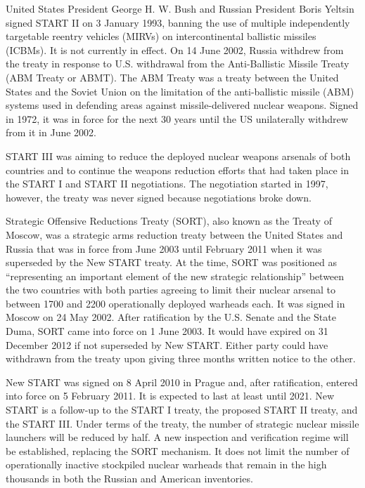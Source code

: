 \documentclass[twoside,titlepage,11pt,twocolumn,a4paper]{article}
\begin{document}
United States President George H. W. Bush and Russian President Boris
Yeltsin signed START II on 3 January 1993, banning the use of multiple
independently targetable reentry vehicles (MIRVs) on intercontinental
ballistic missiles (ICBMs). \citep{startII} It is not currently in
effect. On 14 June 2002, Russia withdrew from the treaty in response
to U.S. withdrawal from the Anti-Ballistic Missile Treaty (ABM Treaty 
or ABMT). The ABM Treaty was a treaty between the United States and
the Soviet Union on the limitation of the anti-ballistic missile (ABM)
systems used in defending areas against missile-delivered nuclear
weapons. Signed in 1972, it was in force for the next 30 years until
the US unilaterally withdrew from it in June 2002. \citep{burr2001}

START III was aiming to reduce the deployed nuclear weapons arsenals
of both countries and to continue the weapons reduction efforts that
had taken place in the START I and START II
negotiations. \citep{startIII} The negotiation started in 1997,
however, the treaty was never signed because negotiations broke down.

Strategic Offensive Reductions Treaty (SORT), also known as the Treaty
of Moscow, was a strategic arms reduction treaty between the United
States and Russia that was in force from June 2003 until February 2011
when it was superseded by the New START treaty. \citep{USRussia} At
the time, SORT was positioned as ``representing an important element
of the new strategic relationship'' between the two countries with
both parties agreeing to limit their nuclear arsenal to between 1700
and 2200 operationally deployed warheads each. It was signed in Moscow
on 24 May 2002. After ratification by the U.S. Senate and the State
Duma, SORT came into force on 1 June 2003. It would have expired on 31
December 2012 if not superseded by New START. Either party could have
withdrawn from the treaty upon giving three months written notice to
the other.

New START was signed on 8 April 2010 in Prague and, after
ratification, entered into force on 5 February 2011. It is expected to
last at least until 2021. \citep{USAtoday} New START is a follow-up to
the START I treaty, the proposed START II treaty, and the START
III. Under terms of the treaty, the number of strategic nuclear
missile launchers will be reduced by half. A new inspection and
verification regime will be established, replacing the SORT
mechanism. It does not limit the number of operationally inactive
stockpiled nuclear warheads that remain in the high thousands in both
the Russian and American inventories.
\end{document}
